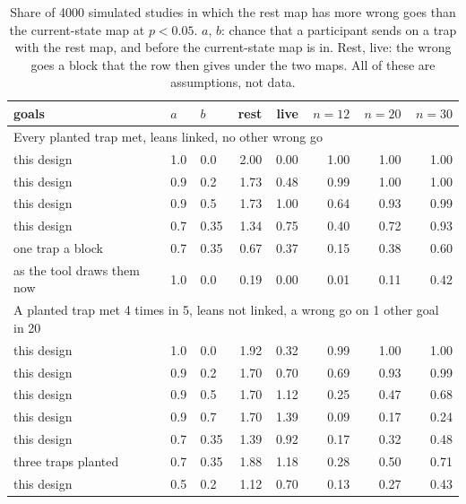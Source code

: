 \documentclass[pdflatex,sn-mathphys-num]{sn-jnl}
\begin{document}
\begin{table}[t]
\caption{Share of 4000 simulated studies in which the rest map has more wrong goes than the current-state map at
$p<0.05$. $a$, $b$: chance that a participant sends on a trap with the rest map, and before the current-state
map is in. Rest, live: the wrong goes a block that the row then gives under the two maps. All of these are
assumptions, not data.}\label{tab:power}
\centering
\begin{tabular}{lllrrrrr}
\toprule
goals & $a$ & $b$ & rest & live & $n=12$ & $n=20$ & $n=30$ \\
\midrule
\multicolumn{8}{l}{Every planted trap met, leans linked, no other wrong go} \\
this design & 1.0 & 0.0 & 2.00 & 0.00 & 1.00 & 1.00 & 1.00 \\
this design & 0.9 & 0.2 & 1.73 & 0.48 & 0.99 & 1.00 & 1.00 \\
this design & 0.9 & 0.5 & 1.73 & 1.00 & 0.64 & 0.93 & 0.99 \\
this design & 0.7 & 0.35 & 1.34 & 0.75 & 0.40 & 0.72 & 0.93 \\
one trap a block & 0.7 & 0.35 & 0.67 & 0.37 & 0.15 & 0.38 & 0.60 \\
as the tool draws them now & 1.0 & 0.0 & 0.19 & 0.00 & 0.01 & 0.11 & 0.42 \\
\midrule
\multicolumn{8}{l}{A planted trap met 4 times in 5, leans not linked, a wrong go on 1 other goal in 20} \\
this design & 1.0 & 0.0 & 1.92 & 0.32 & 0.99 & 1.00 & 1.00 \\
this design & 0.9 & 0.2 & 1.70 & 0.70 & 0.69 & 0.93 & 0.99 \\
this design & 0.9 & 0.5 & 1.70 & 1.12 & 0.25 & 0.47 & 0.68 \\
this design & 0.9 & 0.7 & 1.70 & 1.39 & 0.09 & 0.17 & 0.24 \\
this design & 0.7 & 0.35 & 1.39 & 0.92 & 0.17 & 0.32 & 0.48 \\
three traps planted & 0.7 & 0.35 & 1.88 & 1.18 & 0.28 & 0.50 & 0.71 \\
this design & 0.5 & 0.2 & 1.12 & 0.70 & 0.13 & 0.27 & 0.43 \\
\bottomrule
\end{tabular}
\end{table}
\end{document}

